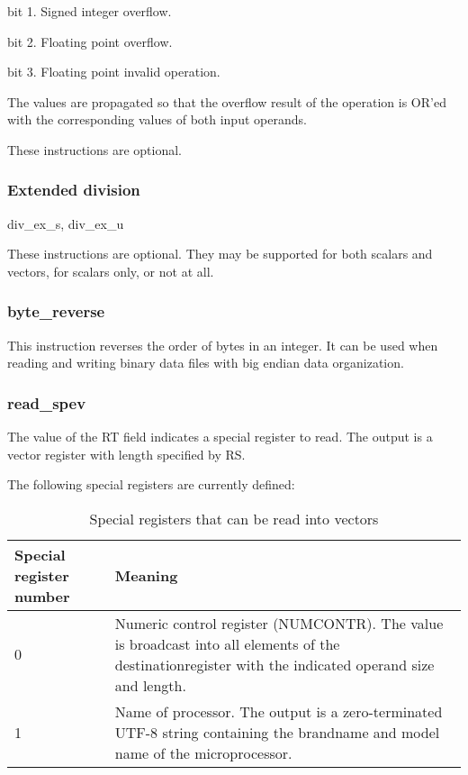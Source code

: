 \documentclass[forwardcom.tex]{subfiles}
\begin{document}
bit 1. Signed integer overflow.

bit 2. Floating point overflow.

bit 3. Floating point invalid operation.
\vspace{2mm}

The values are propagated so that the overflow result of the operation is OR'ed with the corresponding values of both input operands.
\vspace{2mm}

These instructions are optional.

\subsubsection{Extended division} \label{extendedDivisionInstruction}
div\_ex\_s, div\_ex\_u
\vspace{2mm}

These instructions are optional. They may be supported for both scalars and vectors, for scalars only, or not at all.

\subsubsection{byte\_reverse}
This instruction reverses the order of bytes in an integer. It can be used when reading and writing binary data files with big endian data organization.

\subsubsection{read\_spev}
The value of the RT field indicates a special register to read. The output is a vector register with length specified by RS.
\vspace{2mm}

The following special registers are currently defined:

\begin{longtable} {|p{15mm}|p{100mm}|}
\caption{Special registers that can be read into vectors} 
\label{table:specialVectorRegisters} \\
\endfirsthead
\endhead
\hline
\bfseries Special register number & \bfseries Meaning  \\
\hline
0 & Numeric control register (NUMCONTR). The value is broadcast into all elements of the destinationregister with the indicated operand size and length.  \\
\hline
1 & Name of processor. The output is a zero-terminated UTF-8 string containing the brandname and model name of the microprocessor. \\
\hline
\end{longtable}
\end{document}
